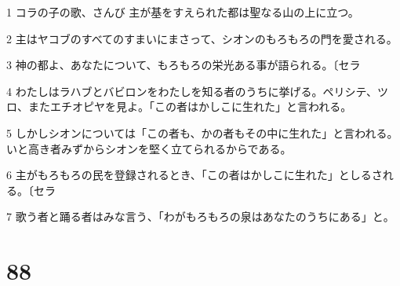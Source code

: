 \par 1 コラの子の歌、さんび 主が基をすえられた都は聖なる山の上に立つ。
\par 2 主はヤコブのすべてのすまいにまさって、シオンのもろもろの門を愛される。
\par 3 神の都よ、あなたについて、もろもろの栄光ある事が語られる。〔セラ
\par 4 わたしはラハブとバビロンをわたしを知る者のうちに挙げる。ペリシテ、ツロ、またエチオピヤを見よ。「この者はかしこに生れた」と言われる。
\par 5 しかしシオンについては「この者も、かの者もその中に生れた」と言われる。いと高き者みずからシオンを堅く立てられるからである。
\par 6 主がもろもろの民を登録されるとき、「この者はかしこに生れた」としるされる。〔セラ
\par 7 歌う者と踊る者はみな言う、「わがもろもろの泉はあなたのうちにある」と。

\chapter{88}

